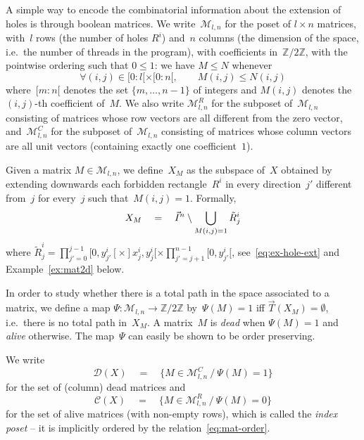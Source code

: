 \documentclass[orivec]{llncs} \usepackage[T1]{fontenc}
\newcommand\set[1]{\{#1\}}
\newcommand\setof[2]{\set{#1\ /\ #2}}
\newcommand{\Nint}[2]{[#1:#2[}
\newcommand{\C}{\mathcal{C}}
\newcommand{\nbd}{\nobreakdash-\hspace{0pt}}
\newcommand{\ie}{i.e.~}
\newcommand{\qeq}{\quad=\quad}
\newcommand{\Z}{\mathbb{Z}}
\newcommand{\tspace}[1]{\vec T(#1)}
\newcommand{\Mat}{\mathcal{M}}
\newcommand{\D}{\mathcal{D}}
\renewcommand{\leq}{\leqslant}
\renewcommand{\C}{\mathcal{C}}
\begin{document}
A simple way to encode the combinatorial information about the extension of
holes is through boolean matrices. We write~$\Mat_{l,n}$ for the poset of
$l\times n$ matrices, with~$l$ rows (the number of holes $R^i$) and~$n$ columns
(the dimension of the space, \ie the number of threads in the program), with
coefficients in~$\Z/2\Z$, with the pointwise ordering such that $0\leq 1$: we
have $M\leq N$ whenever
\begin{equation}
  \label{eq:mat-order}
  \forall (i,j)\in\Nint 0l\times\Nint 0n,\qquad M(i,j)\leq N(i,j)
\end{equation}
where~$\Nint mn$ denotes the set $\set{m,\ldots, n-1}$ of integers and $M(i,j)$
denotes the $(i,j)$\nbd{}th coefficient of~$M$. We also write $\Mat_{l,n}^R$ for
the subposet of~$\Mat_{l,n}$ consisting of matrices whose row vectors are all
different from the zero vector, and~$\Mat_{l,n}^C$ for the subposet
of~$\Mat_{l,n}$ consisting of matrices whose column vectors are all unit vectors
(containing exactly one coefficient~$1$).

Given a matrix $M\in\Mat_{l,n}$, we define~$X_M$ as the subspace of~$X$ obtained
by extending downwards each forbidden rectangle~$R^i$ in every direction~$j'$
different from~$j$ for every~$j$ such that~$M(i,j)=1$. Formally,
\[
X_M
\qeq
\dui^n\setminus\bigcup_{M(i,j)=1}\tilde{R}^i_j
\]
where $\tilde{R}^i_j= \prod_{j'=0}^{j-1}[0,y^i_{j'}[\times]x^i_j,y^i_j[
\times\prod_{j'=j+1}^{n-1}[0,y^i_{j'}[$, see~\eqref{eq:ex-hole-ext} and
Example~\ref{ex:mat2d} below.


In order to study whether there is a total path in the space associated to a
matrix, we define a map \hbox{$\Psi:\Mat_{l,n}\to\Z/2\Z$} by~$\Psi(M)=1$ iff
$\tspace{X_M}=\emptyset$, \ie there is no total path in~$X_M$. A matrix~$M$ is
\emph{dead} when $\Psi(M)=1$ and \emph{alive} otherwise. The map~$\Psi$ can
easily be shown to be order preserving.

\begin{definition}
  We write
  \[
  \D(X)
  \qeq
  \setof{M\in\Mat_{l,n}^C}{\Psi(M)=1}
  \]
  for the set of (column) dead matrices and
  \[
  \C(X)
  \qeq
  \setof{M\in\Mat_{l,n}^R}{\Psi(M)=0}
  \]
  for the set of alive matrices (with non-empty rows), which is called the
  \emph{index poset} -- it is implicitly ordered by the
  relation~\eqref{eq:mat-order}.
\end{definition}
\end{document}
